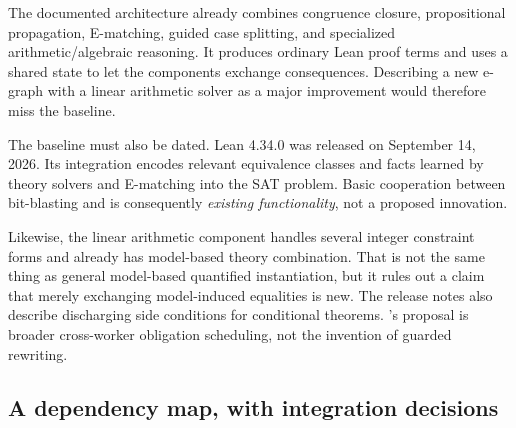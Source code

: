 The documented \Grind{} architecture already combines congruence closure,
propositional propagation, E-matching, guided case splitting, and specialized
arithmetic/algebraic reasoning. It produces ordinary Lean proof terms and uses
a shared state to let the components exchange consequences. Describing a new
e-graph with a linear arithmetic solver as a major improvement would therefore
miss the baseline.\cite{grind}

The baseline must also be dated. Lean 4.34.0 was released on September 14,
2026. Its  integration encodes relevant equivalence
classes and facts learned by theory solvers and E-matching into the SAT
problem. Basic cooperation between bit-blasting and \Grind{} is consequently
\emph{existing functionality}, not a proposed \Forge{} innovation.\cite{release434}

Likewise, the linear arithmetic component handles several integer constraint
forms and already has model-based theory combination. That is not the same
thing as general model-based quantified instantiation, but it rules out a
claim that merely exchanging model-induced equalities is new.\cite{grindlia}
The release notes also describe \Grind{} discharging side conditions for
conditional  theorems. \Forge{}'s proposal is broader
cross-worker obligation scheduling, not the invention of guarded rewriting.
\cite{release434}

\subsection{A dependency map, with integration decisions}

